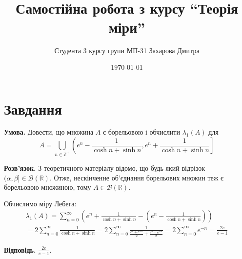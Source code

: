\documentclass[14pt]{extarticle}
\title{Самостійна робота з курсу ``Теорія міри''}
\author{Студента 3 курсу групи МП-31 Захарова Дмитра}
\date{\today}
\begin{document}
\maketitle

\section*{Завдання}
\textbf{Умова.} Довести, що множина $A$ є борельовою і обчислити $\lambda_1(A)$ для
\[
A = \bigcup_{n \in \mathbb{Z}^+}\left(e^n -\frac{1}{\cosh n + \sinh n},e^n + \frac{1}{\cosh n + \sinh n}\right]
\]

\textbf{Розв'язок.} З теоретичного матеріалу відомо, що будь-який відрізок $(\alpha,\beta] \in \mathcal{B}(\mathbb{R})$. Отже, нескінченне об'єднання борельових множин теж є борельовою множиною, тому $A \in \mathcal{B}(\mathbb{R})$. 

Обчислимо міру Лебега:
\begin{gather*}
\lambda_1(A) = \sum_{n=0}^{\infty}\left(e^n + \frac{1}{\cosh n + \sinh n} - \left(e^n - \frac{1}{\cosh n + \sinh n}\right)\right) \\ = 2\sum_{n=0}^{\infty} \frac{1}{\cosh n + \sinh n} = 2\sum_{n=0}^{\infty} \frac{1}{\frac{e^n+e^{-n}}{2} + \frac{e^n - e^{-n}}{2}} = 2\sum_{n=0}^{\infty}e^{-n} = \frac{2e}{e-1}
\end{gather*}

\textbf{Відповідь.} $\frac{2e}{e-1}$.
\end{document}
